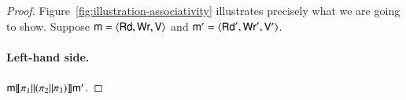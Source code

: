 \begin{proof}

Figure~\ref{fig:illustration-associativity} illustrates precisely what we are going to show.
Suppose $\mathsf m = \langle \mathsf{Rd}, \mathsf{Wr}, \mathsf{V} \rangle$ and $\mathsf m' = \langle \mathsf{Rd}', \mathsf{Wr}', \mathsf{V}' \rangle$.




\paragraph{Left-hand side.} $\mathsf m \llbracket  \pi_1 {||} (\pi_2 {||} \pi_3)  \rrbracket \mathsf m'$.


\end{proof}
